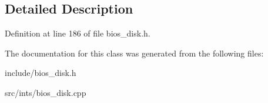 \subsection{Detailed Description}


Definition at line 186 of file bios\-\_\-disk.\-h.



The documentation for this class was generated from the following files\-:\begin{DoxyCompactItemize}
\item 
include/bios\-\_\-disk.\-h\item 
src/ints/bios\-\_\-disk.\-cpp\end{DoxyCompactItemize}
